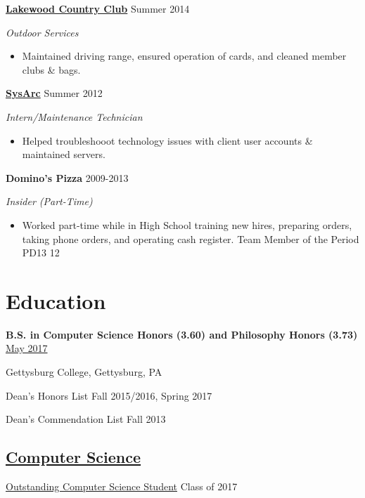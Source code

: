 \documentclass[11pt]{article}
\begin{document}
\textbf{\href{http://www.lakewoodcc.org/}{Lakewood Country Club}}
\hfill
Summer 2014

\textit{Outdoor Services}

\begin{itemize}
\item Maintained driving range, ensured operation of cards, and cleaned member clubs \& bags.\\
\end{itemize}

\textbf{\href{http://www.sysarc.com/}{SysArc}}
\hfill
Summer 2012

\textit{Intern/Maintenance Technician}

\begin{itemize}
\item  Helped troubleshooot technology issues with client user accounts \& maintained servers.\\
\end{itemize}

\textbf{Domino's Pizza}
\hfill
2009-2013

\textit{Insider \small{(Part-Time)}}

\begin{itemize}
\item  Worked part-time while in High School training new hires, preparing orders, taking phone orders, and operating cash register.  Team Member of the Period PD13 12
\end{itemize}

\section*{Education}
\textbf{B.S. in Computer Science {\footnotesize Honors (3.60)} and Philosophy {\footnotesize Honors (3.73)}}
\hfill
\href{https://www.gettysburg.edu/commencement/2017/pdfs/2017\%20Commencement\%20Program\%20FINAL.pdf}{May 2017}

Gettysburg College, Gettysburg, PA

Dean's Honors List \hfill Fall 2015/2016, Spring 2017

Dean's Commendation List \hfill Fall 2013

\subsection*{\underline{Computer Science}}

\href{http://www.gettysburg.edu/academics/cs/programs/honors.dot}{Outstanding Computer Science Student} \hfill Class of 2017
\end{document}
